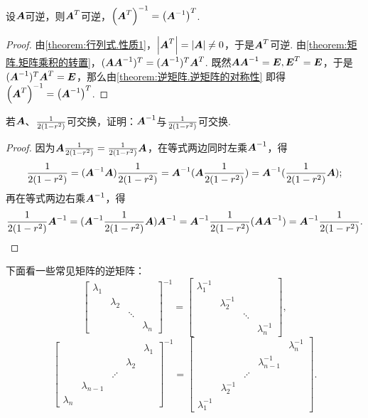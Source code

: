 \begin{property}\label{theorem:逆矩阵.转置矩阵的逆与逆矩阵的转置}
设\(\A\)可逆，则\(\A^T\)可逆，\(\left(\A^T\right)^{-1}=\left(\A^{-1}\right)^T\).
\begin{proof}
由\cref{theorem:行列式.性质1}，\(\abs{\A^T}=\abs{\A}\neq0\)，于是\(\A^T\)可逆.
由\cref{theorem:矩阵.矩阵乘积的转置}，\((\A \A^{-1})^T = (\A^{-1})^T \A^T\).
既然\(\A \A^{-1} = \E, \E^T = \E\)，于是\((\A^{-1})^T \A^T = \E\)，那么由\cref{theorem:逆矩阵.逆矩阵的对称性} 即得\(\left(\A^T\right)^{-1}=\left(\A^{-1}\right)^T\).
\end{proof}
\end{property}

\begin{example}
若\(\A\)、\(\B\)可交换，证明：\(\A^{-1}\)与\(\B\)可交换.
\begin{proof}
因为\(\A\B = \B\A\)，在等式两边同时左乘\(\A^{-1}\)，得\[
\B = (\A^{-1}\A)\B = \A^{-1}(\A\B) = \A^{-1}(\B\A);
\]再在等式两边右乘\(\A^{-1}\)，得\[
\B\A^{-1} = (\A^{-1}\B\A)\A^{-1} = \A^{-1}\B(\A\A^{-1}) = \A^{-1}\B.
\qedhere
\]
\end{proof}
\end{example}

\begin{example}
下面看一些常见矩阵的逆矩阵：
\[
\begin{bmatrix}
\lambda_1 \\
& \lambda_2 \\
&& \ddots \\
&&& \lambda_n
\end{bmatrix}^{-1}
= \begin{bmatrix}
\lambda_1^{-1} \\
& \lambda_2^{-1} \\
&& \ddots \\
&&& \lambda_n^{-1}
\end{bmatrix},
\]\[
\begin{bmatrix}
& & & & \lambda_1 \\
& & & \lambda_2 \\
& & \iddots \\
& \lambda_{n-1} \\
\lambda_n
\end{bmatrix}^{-1}
= \begin{bmatrix}
& & & & \lambda_n^{-1} \\
& & & \lambda_{n-1}^{-1} \\
& & \iddots \\
& \lambda_2^{-1} \\
\lambda_1^{-1}
\end{bmatrix}.
\]
\end{example}

